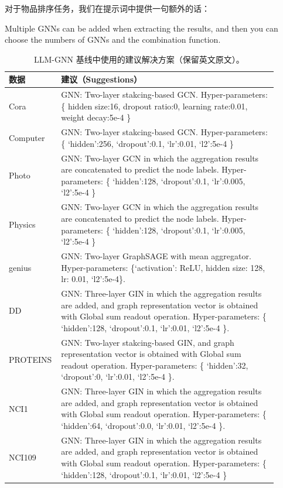 \documentclass[11pt,UTF8,fontset=fandol]{ctexart}
\begin{document}
对于物品排序任务，我们在提示词中提供一句额外的话：

\begin{promptbox}
Multiple GNNs can be added when extracting the results, and then you can choose the numbers of GNNs and the combination function.
\end{promptbox}

\begin{table}[H]\centering
\caption{LLM-GNN 基线中使用的建议解决方案（保留英文原文）。}
\label{tab:21}
\renewcommand{\arraystretch}{1.25}
\begin{tabular}{p{0.13\linewidth} p{0.78\linewidth}}
\toprule
数据 & 建议（Suggestions） \\
\midrule
Cora & GNN: Two-layer stakcing-based GCN. Hyper-parameters: \{ hidden size:16, dropout ratio:0, learning rate:0.01, weight decay:5e-4 \} \\
Computer & GNN: Two-layer stakcing-based GCN. Hyper-parameters: \{ `hidden':256, `dropout':0.1, `lr':0.01, `l2':5e-4 \} \\
Photo & GNN: Two-layer GCN in which the aggregation results are concatenated to predict the node labels. Hyper-parameters: \{ `hidden':128, `dropout':0.1, `lr':0.005, `l2':5e-4 \} \\
Physics & GNN: Two-layer GCN in which the aggregation results are concatenated to predict the node labels. Hyper-parameters: \{ `hidden':128, `dropout':0.1, `lr':0.005, `l2':5e-4 \} \\
genius & GNN: Two-layer GraphSAGE with mean aggregator. Hyper-parameters: \{`activation': ReLU, hidden size: 128, lr: 0.01, `l2':5e-4\}. \\
DD & GNN: Three-layer GIN in which the aggregation results are added, and graph representation vector is obtained with Global sum readout operation. Hyper-parameters: \{ `hidden':128, `dropout':0.1, `lr':0.01, `l2':5e-4 \}. \\
PROTEINS & GNN: Two-layer stakcing-based GIN, and graph representation vector is obtained with Global sum readout operation. Hyper-parameters: \{ `hidden':32, `dropout':0, `lr':0.01, `l2':5e-4 \}. \\
NCI1 & GNN: Three-layer GIN in which the aggregation results are added, and graph representation vector is obtained with Global sum readout operation. Hyper-parameters: \{ `hidden':64, `dropout':0.0, `lr':0.01, `l2':5e-4 \}. \\
NCI109 & GNN: Three-layer GIN in which the aggregation results are added, and graph representation vector is obtained with Global sum readout operation. Hyper-parameters: \{ `hidden':128, `dropout':0.1, `lr':0.01, `l2':5e-4 \} \\

\end{tabular}
\end{table}
\end{document}

